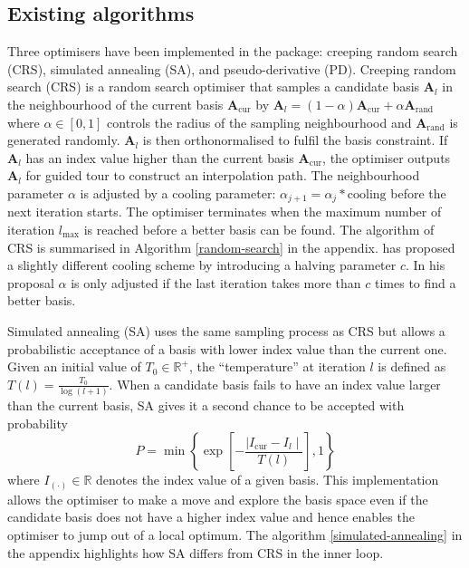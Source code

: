 \hypertarget{existing-algorithms}{%
\subsection{Existing algorithms}\label{existing-algorithms}}

Three optimisers have been implemented in the  \citep{tourr}
package: creeping random search (CRS), simulated annealing (SA), and
pseudo-derivative (PD). Creeping random search (CRS) is a random search
optimiser that samples a candidate basis \(\mathbf{A}_{l}\) in the
neighbourhood of the current basis \(\mathbf{A}_{\text{cur}}\) by
\(\mathbf{A}_{l} = (1- \alpha)\mathbf{A}_{\text{cur}} + \alpha \mathbf{A}_{\text{rand}}\)
where \(\alpha \in [0,1]\) controls the radius of the sampling
neighbourhood and \(\mathbf{A}_{\text{rand}}\) is generated randomly.
\(\mathbf{A}_{l}\) is then orthonormalised to fulfil the basis
constraint. If \(\mathbf{A}_{l}\) has an index value higher than the
current basis \(\mathbf{A}_{\text{cur}}\), the optimiser outputs
\(\mathbf{A}_{l}\) for guided tour to construct an interpolation path.
The neighbourhood parameter \(\alpha\) is adjusted by a cooling
parameter: \(\alpha_{j+1} = \alpha_j * \text{cooling}\) before the next
iteration starts. The optimiser terminates when the maximum number of
iteration \(l_{\max}\) is reached before a better basis can be found.
The algorithm of CRS is summarised in Algorithm \ref{random-search} in
the appendix. \citet{posse1995projection} has proposed a slightly
different cooling scheme by introducing a halving parameter \(c\). In
his proposal \(\alpha\) is only adjusted if the last iteration takes
more than \(c\) times to find a better basis.

Simulated annealing (SA) uses the same sampling process as CRS but
allows a probabilistic acceptance of a basis with lower index value than
the current one. Given an initial value of \(T_0 \in \mathbb{R^{+}}\),
the ``temperature'' at iteration \(l\) is defined as
\(T(l) = \frac{T_0}{\log(l + 1)}\). When a candidate basis fails to have
an index value larger than the current basis, SA gives it a second
chance to be accepted with probability
\[P= \min\left\{\exp\left[-\frac{\mid I_{\text{cur}} - I_{l} \mid}{T(l)}\right],1\right\}\]
where \(I_{(\cdot)} \in \mathbb{R}\) denotes the index value of a given
basis. This implementation allows the optimiser to make a move and
explore the basis space even if the candidate basis does not have a
higher index value and hence enables the optimiser to jump out of a
local optimum. The algorithm \ref{simulated-annealing} in the appendix
highlights how SA differs from CRS in the inner loop.

